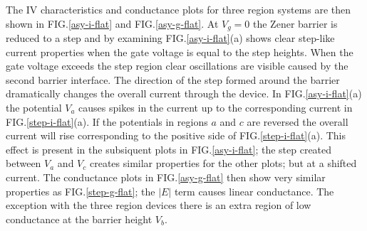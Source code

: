 \documentclass[prl,twocolumn,aps,superscriptaddress,floatfix,10pt]{revtex4}
\begin{document}
	The IV characteristics and conductance plots for three region systems are then shown in FIG.\ref{asy-i-flat} and FIG.\ref{asy-g-flat}. At $V_{g}=0$ the Zener barrier is reduced to a step and by examining FIG.\ref{asy-i-flat}(a) shows clear step-like current properties when the gate voltage is equal to the step heights. When the gate voltage exceeds the step region clear oscillations are visible caused by the second barrier interface. The direction of the step formed around the barrier dramatically changes the overall current through the device. In FIG.\ref{asy-i-flat}(a) the potential $V_{a}$ causes spikes in the current up to the corresponding current in FIG.\ref{step-i-flat}(a). If the potentials in regions $a$ and $c$ are reversed the overall current will rise corresponding to the positive side of FIG.\ref{step-i-flat}(a). This effect is present in the subsiquent plots in FIG.\ref{asy-i-flat}; the step created between $V_{a}$ and $V_{c}$ creates similar properties for the other plots; but at a shifted current.
	The conductance plots in FIG.\ref{asy-g-flat} then show very similar properties as FIG.\ref{step-g-flat}; the $|E|$ term causes linear conductance. The exception with the three region devices there is an extra region of low conductance at the barrier height $V_{b}$.

\end{document}
